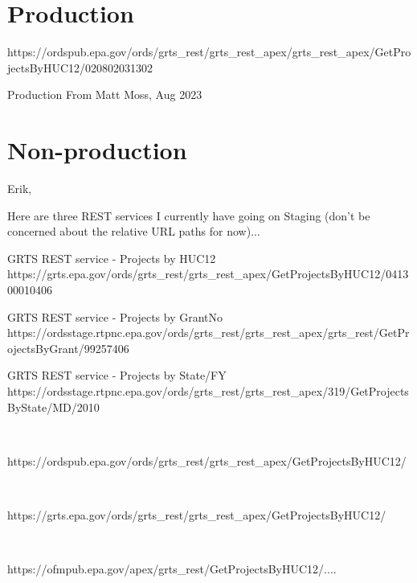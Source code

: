 





\section{Production}


    https://ordspub.epa.gov/ords/grts_rest/grts_rest_apex/grts_rest_apex/GetProjectsByHUC12/020802031302

Production
From Matt Moss, Aug 2023

\section{Non-production}

Erik,

Here are three REST services I currently have going on Staging (don't be concerned about the relative URL paths for now)...

GRTS REST service - Projects by HUC12
       https://grts.epa.gov/ords/grts_rest/grts_rest_apex/GetProjectsByHUC12/041300010406

GRTS REST service - Projects by GrantNo
    https://ordsstage.rtpnc.epa.gov/ords/grts_rest/grts_rest_apex/grts_rest/GetProjectsByGrant/99257406

GRTS REST service - Projects by State/FY
     https://ordsstage.rtpnc.epa.gov/ords/grts_rest/grts_rest_apex/319/GetProjectsByState/MD/2010


~~~~

https://ordspub.epa.gov/ords/grts_rest/grts_rest_apex/GetProjectsByHUC12/

~~~

https://grts.epa.gov/ords/grts_rest/grts_rest_apex/GetProjectsByHUC12/
  
~~~~


https://ofmpub.epa.gov/apex/grts_rest/GetProjectsByHUC12/....
 
